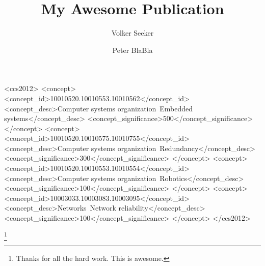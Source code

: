 \documentclass[format=acmsmall, review=false, screen=true]{acmart}
\begin{document}
\title[Awesome]
{My Awesome Publication}

\author{Volker Seeker}
\author{Peter BlaBla}



%
%
\begin{CCSXML}
<ccs2012>
 <concept>
  <concept_id>10010520.10010553.10010562</concept_id>
  <concept_desc>Computer systems organization~Embedded systems</concept_desc>
  <concept_significance>500</concept_significance>
 </concept>
 <concept>
  <concept_id>10010520.10010575.10010755</concept_id>
  <concept_desc>Computer systems organization~Redundancy</concept_desc>
  <concept_significance>300</concept_significance>
 </concept>
 <concept>
  <concept_id>10010520.10010553.10010554</concept_id>
  <concept_desc>Computer systems organization~Robotics</concept_desc>
  <concept_significance>100</concept_significance>
 </concept>
 <concept>
  <concept_id>10003033.10003083.10003095</concept_id>
  <concept_desc>Networks~Network reliability</concept_desc>
  <concept_significance>100</concept_significance>
 </concept>
</ccs2012>
\end{CCSXML}


%
%



\thanks{Thanks for all the hard work. This is awesome.}

\maketitle

\renewcommand{\shortauthors}{V. Seeker et. al.}











\end{document}
